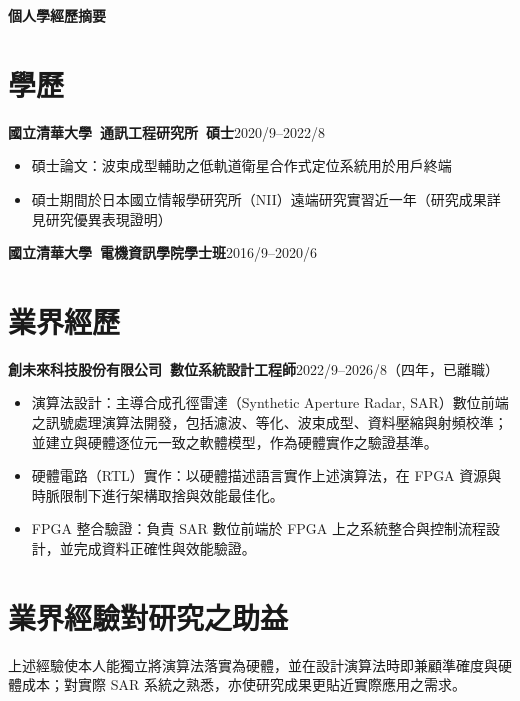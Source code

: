 \documentclass[11pt,fontset=none]{ctexart}
\newcommand{\entry}[2]{\noindent\textbf{#1}\hfill #2\par}
\begin{document}
\begin{center}
  {\Large\bfseries 個人學經歷摘要\par}
\end{center}

\section{學歷}

\entry{國立清華大學\ 通訊工程研究所\ 碩士}{2020/9--2022/8}
\begin{itemize}
  \item 碩士論文：波束成型輔助之低軌道衛星合作式定位系統用於用戶終端
  \item 碩士期間於日本國立情報學研究所（NII）遠端研究實習近一年（研究成果詳見研究優異表現證明）
\end{itemize}
\entry{國立清華大學\ 電機資訊學院學士班}{2016/9--2020/6}

\section{業界經歷}

\entry{創未來科技股份有限公司\ 數位系統設計工程師}{2022/9--2026/8（四年，已離職）}
\begin{itemize}
  \item 演算法設計：主導合成孔徑雷達（Synthetic Aperture Radar, SAR）數位前端之訊號處理演算法開發，包括濾波、等化、波束成型、資料壓縮與射頻校準；並建立與硬體逐位元一致之軟體模型，作為硬體實作之驗證基準。
  \item 硬體電路（RTL）實作：以硬體描述語言實作上述演算法，在 FPGA 資源與時脈限制下進行架構取捨與效能最佳化。
  \item FPGA 整合驗證：負責 SAR 數位前端於 FPGA 上之系統整合與控制流程設計，並完成資料正確性與效能驗證。
\end{itemize}

\section{業界經驗對研究之助益}

上述經驗使本人能獨立將演算法落實為硬體，並在設計演算法時即兼顧準確度與硬體成本；對實際 SAR 系統之熟悉，亦使研究成果更貼近實際應用之需求。
\end{document}

